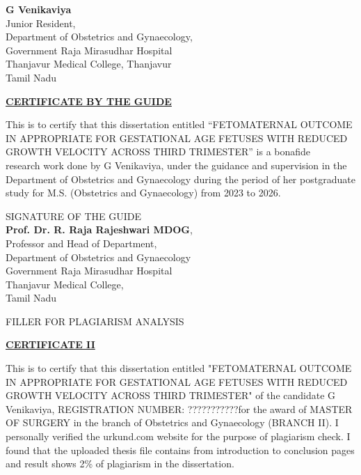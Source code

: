 \documentclass[14pt]{extarticle}
\def\name{G Venikaviya}
\def\study{FETOMATERNAL OUTCOME IN APPROPRIATE FOR GESTATIONAL AGE FETUSES WITH REDUCED GROWTH VELOCITY ACROSS THIRD TRIMESTER}
\def\guide{Prof. Dr. R. Raja Rajeshwari MDOG}
\def\guidedes{Professor and Head of Department}
\def\regno{???????????}
\begin{document}
\vspace{12mm}
\begin{flushright}
\textbf{\name} \\ Junior Resident, \\ Department of Obstetrics and Gynaecology, \\Government Raja Mirasudhar Hospital\\ Thanjavur Medical College, Thanjavur \\ Tamil Nadu 
\end{flushright}

\newpage

\null

\centerline{\underline{{\Large\textbf{CERTIFICATE BY THE GUIDE}}}}

\vspace{7mm}
This is to certify that this dissertation entitled {\small ``\study''} is a
bonafide \\ research work done by \name, under the guidance and supervision in
the Department of Obstetrics and Gynaecology during the period of her postgraduate study for M.S. (Obstetrics and Gynaecology) from 2023 to 2026.

\vspace{20mm}
\begin{flushright}
{\small SIGNATURE OF THE GUIDE\\[5pt]\textbf{\guide}, \\[5pt]\guidedes, \\ Department of
Obstetrics and Gynaecology \\ Government Raja Mirasudhar Hospital \\ Thanjavur Medical
College, \\ Tamil Nadu}
\end{flushright}


\newpage

FILLER FOR PLAGIARISM ANALYSIS

\newpage

\null

\centerline{\underline{{\Large\textbf{CERTIFICATE II}}}}

\vspace{7mm}
This is to certify that this dissertation entitled "\study" of the candidate
\name, REGISTRATION NUMBER: \regno for the award of MASTER OF SURGERY in the
branch of Obstetrics and Gynaecology (BRANCH II). I personally verified the
urkund.com website for the purpose of plagiarism check. I found that the
uploaded thesis file contains from introduction to conclusion pages and result
shows 2\% of plagiarism in the dissertation.
\end{document}
